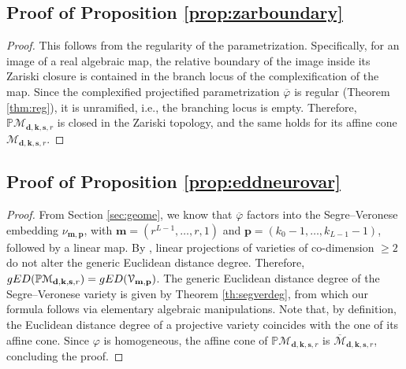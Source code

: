 \documentclass[twoside]{article}
\theoremstyle{plain}%
\theoremstyle{definition}
\theoremstyle{remark}
\newcommand{\edd}{\textnormal{gED}}
\begin{document}
\subsection{Proof of Proposition \ref{prop:zarboundary}}\label{app:zarboundary}
\begin{proof}
This follows from the regularity of the parametrization. Specifically, for an image of a real algebraic map, the relative boundary of the image inside its Zariski closure is contained in the branch locus of the complexification of the map. Since the complexified projectified parametrization $\overline{\varphi}$ is regular (Theorem \ref{thm:reg}), it is unramified, i.e., the branching locus is empty. Therefore, $\mathbb{P}\mathcal{M}_{\mathbf{d}, \mathbf{k}, \mathbf{s}, r}$ is closed in the Zariski topology, and the same holds for its affine cone $\mathcal{M}_{\mathbf{d}, \mathbf{k}, \mathbf{s}, r}$.
 \end{proof}


\subsection{Proof of Proposition \ref{prop:eddneurovar}}\label{app:eddneurovar}
\begin{proof}
From Section \ref{sec:geome}, we know that $\overline{\varphi}$ factors into the Segre--Veronese embedding $\nu_{\mathbf{m}, \mathbf{p}}$, with $\mathbf{m} = (r^{L-1}, \ldots, r, 1)$ and $\mathbf{p} = (k_0 - 1, \ldots, k_{L-1} - 1)$, followed by a linear map. By \cite[Corollary 6.1]{draisma2016euclidean}, linear projections of varieties of co-dimension $\geq 2$ do not alter the generic Euclidean distance degree. Therefore, $\edd(\mathbb{P}\mathcal{M}_{\mathbf{d}, \mathbf{k}, \mathbf{s}, r}) = \edd(\mathcal{V}_{\mathbf{m}, \mathbf{p}})$. The generic Euclidean distance degree of the Segre--Veronese variety is given by Theorem \ref{th:segverdeg}, from which our formula follows via elementary algebraic manipulations. Note that, by definition, the Euclidean distance degree of a projective variety coincides with the one of its affine cone. Since $\varphi$ is homogeneous, the affine cone of $\mathbb{P}\mathcal{M}_{\mathbf{d}, \mathbf{k}, \mathbf{s}, r}$ is $\overline{\mathcal{M}}_{\mathbf{d}, \mathbf{k}, \mathbf{s}, r}$, concluding the proof.     
\end{proof}
\end{document}
